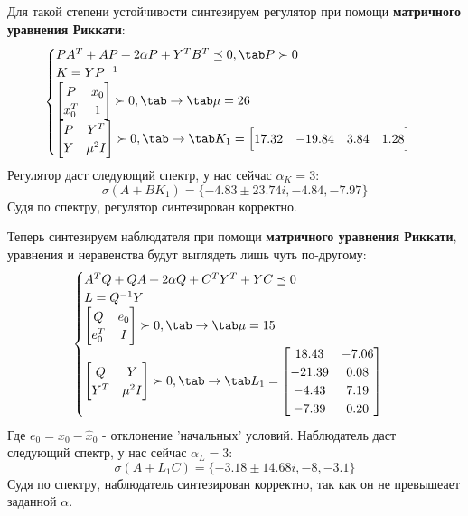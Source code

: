 Для такой степени устойчивости синтезируем регулятор при помощи \textbf{матричного уравнения Риккати}:
$$
\begin{cases}
  PA^T + AP + 2\alpha P + Y^TB^T \preceq 0, \tab P \succ 0 \\
  K = YP^{-1} \\
  \begin{bmatrix}
    P & x_0 \\
    x_0^T & 1
  \end{bmatrix} \succ 0,  \tab \rightarrow \tab \mu = 26 \\
  \begin{bmatrix}
    P & Y^T \\
    Y &\mu^2I
  \end{bmatrix} \succ 0, \tab \rightarrow \tab 
  K_1 = \begin{bmatrix}
   17.32 & -19.84 & 3.84 &  1.28
  \end{bmatrix}
\end{cases}
$$
Регулятор даст следующий спектр, у нас сейчас $\alpha_K = 3$:
$$
  \sigma(A+BK_1) = \{-4.83 \pm 23.74i, -4.84, -7.97 \}
$$
Судя по спектру, регулятор синтезирован корректно. 

Теперь синтезируем наблюдателя при помощи \textbf{матричного уравнения Риккати}, 
уравнения и неравенства будут выглядеть лишь чуть по-другому:
$$
\begin{cases}
  A^T Q + QA + 2\alpha Q + C^T Y^T + YC \preceq 0 \\
  L = Q^{-1}Y \\
  \begin{bmatrix}
    Q & e_0 \\
    e_0^T & I
  \end{bmatrix} \succ 0,  \tab \rightarrow \tab \mu = 15 \\
  \begin{bmatrix}
    Q & Y \\
    Y^T &\mu^2I
  \end{bmatrix} \succ 0, \tab \rightarrow \tab 
  L_1 = \begin{bmatrix}
    18.43 &  -7.06 \\
   -21.39 &  0.08 \\
    -4.43 &  7.19 \\
    -7.39 &  0.20 \\
  \end{bmatrix}
\end{cases}
$$
Где $e_0 = x_0 - \hat{x}_0$ - отклонение 'начальных' условий. Наблюдатель даст следующий спектр, у нас сейчас $\alpha_L = 3$:
$$
  \sigma(A+L_1 C) = \{-3.18 \pm 14.68i, -8, -3.1 \}
$$
Судя по спектру, наблюдатель синтезирован корректно, так как он не превышеает заданной $\alpha$.

